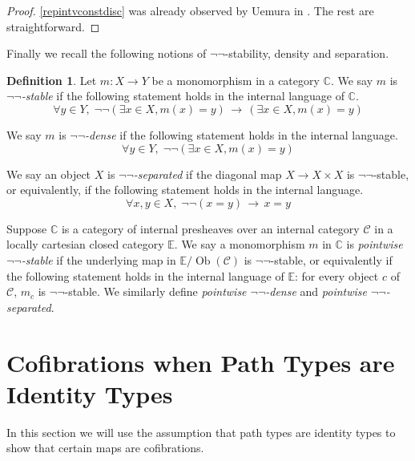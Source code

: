 \documentclass[a4paper]{amsart}
\theoremstyle{definition}
\newtheorem{definition}[theorem]{Definition}
\newcommand{\cat}[1]{\mathbb{#1}}
\newcommand{\catc}{\cat{C}}
\newcommand{\smcat}[1]{\mathcal{#1}}
\begin{document}
\begin{proof}
  \ref{repintvconstdisc} was already observed by Uemura in
  \cite[Proposition 4.7]{uemuracubasm}. The rest are straightforward.
\end{proof}

Finally we recall the following notions of $\neg \neg$-stability,
density and separation.
\begin{definition}
  Let $m \colon X \rightarrow Y$ be a monomorphism in a category
  $\catc$.  We say $m$ is \emph{$\neg \neg$-stable} if the following
  statement holds in the internal language of $\catc$.
  \begin{equation*}
    \forall y \in Y, \; \neg \neg (\exists x \in X, m(x) = y) \,\rightarrow\,
    (\exists x \in X, m(x) = y)
  \end{equation*}

  We say $m$ is \emph{$\neg \neg$-dense} if the following
  statement holds in the internal language.
  \begin{equation*}
    \forall y \in Y, \; \neg \neg (\exists x \in X, m(x) = y)
  \end{equation*}

  We say an object $X$ is \emph{$\neg \neg$-separated} if the diagonal
  map $X \to X \times X$ is $\neg \neg$-stable, or equivalently, if
  the following statement holds in the internal language.
  \begin{equation*}
    \forall x, y \in X, \; \neg \neg(x = y) \,\rightarrow\, x = y
  \end{equation*}

  Suppose $\catc$ is a category of internal presheaves over an
  internal category $\smcat{C}$ in a locally cartesian closed category
  $\cat{E}$. We say a monomorphism $m$ in $\catc$ is \emph{pointwise
    $\neg \neg$-stable} if the underlying map in
  $\cat{E}/\operatorname{Ob}(\smcat{C})$ is $\neg \neg$-stable, or
  equivalently if the following statement holds in the internal
  language of $\cat{E}$: for every object $c$ of $\smcat{C}$, $m_c$ is
  $\neg \neg$-stable. We similarly define \emph{pointwise
    $\neg \neg$-dense} and \emph{pointwise $\neg \neg$-separated}.
\end{definition}

\section{Cofibrations when Path Types are Identity Types}
\label{sec:cofibr-when-path}

In this section we will use the assumption that path types are
identity types to show that certain maps are cofibrations.
\end{document}
